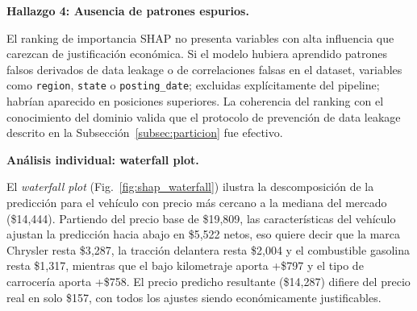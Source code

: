 \documentclass[conference]{IEEEtran}
\begin{document}
\textbf{Hallazgo 4: Ausencia de patrones espurios.}

El ranking de importancia SHAP no presenta variables con alta influencia que carezcan de justificación económica. Si el modelo hubiera aprendido patrones falsos derivados de data leakage o de correlaciones falsas en el dataset, variables como \texttt{region}, \texttt{state} o \texttt{posting\_date}; excluidas explícitamente del pipeline; habrían aparecido en posiciones superiores. La coherencia del ranking con el conocimiento del dominio valida que el protocolo de prevención de data leakage descrito en la Subsección~\ref{subsec:particion} fue efectivo.

\textbf{Análisis individual: waterfall plot.}

El \textit{waterfall plot} (Fig.~\ref{fig:shap_waterfall}) ilustra la descomposición de la predicción para el vehículo con precio más cercano a la mediana del mercado (\$14{,}444). Partiendo del precio base de \$19{,}809, las características del vehículo ajustan la predicción hacia abajo en \$5{,}522 netos, eso quiere decir que la marca Chrysler resta \$3{,}287, la tracción delantera resta \$2{,}004 y el combustible gasolina resta \$1{,}317, mientras que el bajo kilometraje aporta +\$797 y el tipo de carrocería aporta +\$758. El precio predicho resultante (\$14{,}287) difiere del precio real en solo \$157, con todos los ajustes siendo económicamente justificables.

\end{document}
